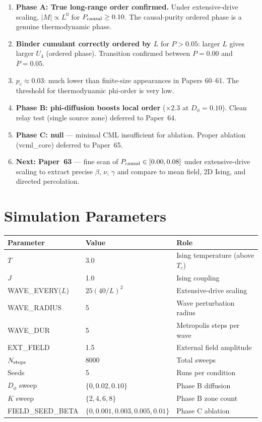 \documentclass[12pt,a4paper]{article}
\begin{document}
\begin{enumerate}
  \item \textbf{Phase A: True long-range order confirmed.}
    Under extensive-drive scaling, $|M| \propto L^{0}$ for $P_{\rm causal} \geq 0.10$.
    The causal-purity ordered phase is a genuine thermodynamic phase.

  \item \textbf{Binder cumulant correctly ordered by $L$} for $P > 0.05$:
    larger $L$ gives larger $U_4$ (ordered phase).
    Transition confirmed between $P = 0.00$ and $P = 0.05$.

  \item \textbf{$p_c \approx 0.03$}: much lower than finite-size appearances in Papers 60--61.
    The threshold for thermodynamic phi-order is very low.

  \item \textbf{Phase B: phi-diffusion boosts local order} ($\times 2.3$ at $D_\phi=0.10$).
    Clean relay test (single source zone) deferred to Paper~64.

  \item \textbf{Phase C: null} --- minimal CML insufficient for ablation.
    Proper ablation (vcml\_core) deferred to Paper~65.

  \item \textbf{Next: Paper~63} — fine scan of $P_{\rm causal} \in [0.00, 0.08]$
    under extensive-drive scaling to extract precise $\beta$, $\nu$, $\gamma$
    and compare to mean field, 2D Ising, and directed percolation.
\end{enumerate}

\appendix
\section{Simulation Parameters}

\begin{center}
\begin{tabular}{lll}
\toprule
Parameter & Value & Role \\
\midrule
$T$ & 3.0 & Ising temperature (above $T_c$) \\
$J$ & 1.0 & Ising coupling \\
WAVE\_EVERY($L$) & $25(40/L)^2$ & Extensive-drive scaling \\
WAVE\_RADIUS & 5 & Wave perturbation radius \\
WAVE\_DUR & 5 & Metropolis steps per wave \\
EXT\_FIELD & 1.5 & External field amplitude \\
$N_{\rm steps}$ & 8000 & Total sweeps \\
Seeds & 5 & Runs per condition \\
$D_\phi$ sweep & $\{0, 0.02, 0.10\}$ & Phase B diffusion \\
$K$ sweep & $\{2,4,6,8\}$ & Phase B zone count \\
FIELD\_SEED\_BETA & $\{0,0.001,0.003,0.005,0.01\}$ & Phase C ablation \\
\bottomrule
\end{tabular}
\end{center}
\end{document}

